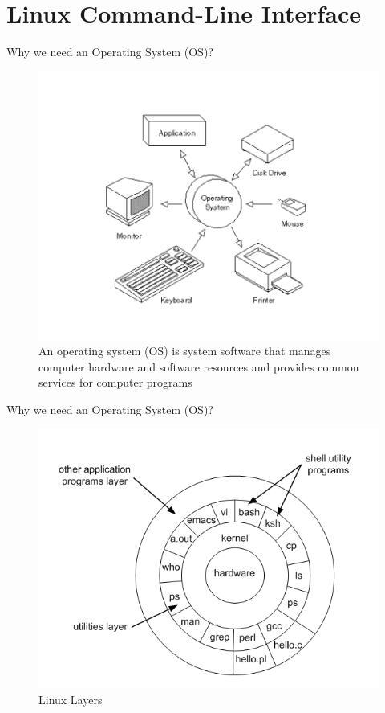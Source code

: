\documentclass{if-beamer}
\begin{document}
\section{Linux Command-Line Interface}
\begin{frame}{Why we need an Operating System (OS)?}
\begin{figure}
\centering
\includegraphics[scale=0.6]{operating_system_components.PNG}
\caption{An operating system (OS) is system software that manages computer hardware and software resources and provides common services for computer programs}
\end{figure}
\end{frame}
\begin{frame}{Why we need an Operating System (OS)?}
\begin{figure}
\centering
\includegraphics[scale=0.55]{linux_layers.PNG}
\caption{Linux Layers}
\end{figure}
\end{frame}
\end{document}
